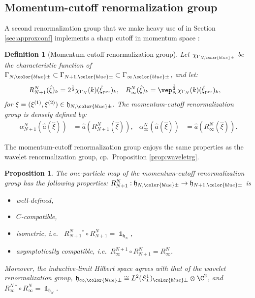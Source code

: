 \documentclass[a4paper, 11pt]{article}
\newcommand{\fh}{\mathfrak{h}}
\DeclareMathOperator{\1}{\mathds{1}}
\DeclareMathOperator{\per}{per}
\newtheorem{prop}[thm]{Proposition}
\newtheorem{defn}[thm]{Definition}
\begin{document}
\subsection{Momentum-cutoff renormalization group}
\label{sec:momcut}
A second renormalization group that we make heavy use of in Section \ref{sec:approxconf} implements a sharp cutoff in momentum space \cite{MorinelliScalingLimitsOf}: 
\begin{defn}[Momentum-cutoff renormalization group]
\label{def:momrg}
Let $\chi_{\Gamma_{N,{\color{blue}\pm}}}$ be the characteristic function of $\Gamma_{N,{\color{blue}\pm}}\subset\Gamma_{N+1,{\color{blue}\pm}}\subset\Gamma_{\infty,{\color{blue}\pm}}$, and let:
\begin{align}
\label{eq:momrg1p}
R^{N}_{N+1}(\hat{\xi})_{k} & = 2^{\frac{1}{2}}\chi_{\Gamma_{N}}(k)(\hat{\xi}_{\per})_{k}, & R^{N}_{\infty}(\hat{\xi})_{k} & = \vep_{N}^{\frac{1}{2}}\chi_{\Gamma_{N}}(k)(\hat{\xi}_{\per})_{k},
\end{align}
for $\xi=(\xi^{(1)},\xi^{(2)})\in\fh_{N,{\color{blue}\pm}}$. The \emph{momentum-cutoff renormalization group} is densely defined by:
\begin{align}
\label{eq:momrg}
\alpha^{N}_{N+1}(\hat{a}(\hat{\xi})) & = \hat{a}(R^{N}_{N+1}(\hat{\xi})), & \alpha^{N}_{\infty}(\hat{a}(\hat{\xi})) & = \hat{a}(R^{N}_{\infty}(\hat{\xi})).
\end{align}
\end{defn}
The momentum-cutoff renormalization group enjoys the same properties as the wavelet renormalization group, cp.~Proposition \ref{prop:waveletrg}.
\begin{prop}
\label{prop:momrg}
The one-particle map of the momentum-cutoff renormalization group has the following properties: $R^{N}_{N+1}:\fh_{N,{\color{blue}\pm}}\rightarrow\fh_{N+1,{\color{blue}\pm}}$ is
\begin{itemize}
	\item[1.] well-defined,
	\item[2.] $C$-compatible,
	\item[3.] isometric, i.e.~ $R^{N}_{N+1}{}^{\!\!*}\circ R^{N}_{N+1} = \1_{\fh_{N}}$, 
	\item[4.] asymptotically compatible, i.e.~$R^{N+1}_{\infty}\circ R^{N}_{N+1} = R^{N}_{\infty}$.
\end{itemize}
Moreover, the inductive-limit Hilbert space agrees with that of the wavelet renormalization group, $\fh_{\infty,{\color{blue}\pm}}\cong L^{2}(S^{1}_{L})_{{\color{blue}\pm}}\otimes\C^{2}$, and $R^{N}_{\infty}{}^{*}\circ R^{N}_{\infty} = \1_{\fh_{N}}$.
\end{prop}
\end{document}
